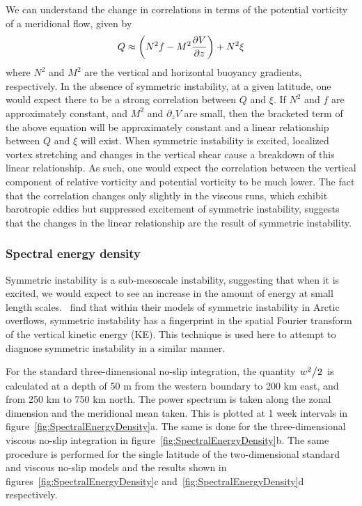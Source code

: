     We can understand the change in correlations in terms of the potential vorticity of a meridional flow, given by
    \begin{equation}
        Q \approx \bigg(N^2 f - M^2 \pdv{V}{z} \bigg) + N^2 \xi
    \end{equation}
    where $N^2$ and $M^2$ are the vertical and horizontal buoyancy gradients, respectively. In the absence of symmetric instability, at a given latitude, one would expect there to be a strong correlation between $Q$ and $\xi$. If $N^2$ and $f$ are approximately constant, and $M^2$ and $\partial_z V$ are small, then the bracketed term of the above equation will be approximately constant and a linear relationship between $Q$ and $\xi$ will exist. When symmetric instability is excited, localized vortex stretching and changes in the vertical shear cause a breakdown of this linear relationship. As such, one would expect the correlation between the vertical component of relative vorticity and potential vorticity to be much lower. The fact that the correlation changes only slightly in the viscous runs, which exhibit barotropic eddies but suppressed excitement of symmetric instability, suggests that the changes in the linear relationship are the result of symmetric instability.

    \subsubsection{Spectral energy density}
    Symmetric instability is a sub-mesoscale instability, suggesting that when it is excited, we would expect to see an increase in the amount of energy at small length scales.~\citet{Yankovsky2019} find that within their models of symmetric instability in Arctic overflows, symmetric instability has a fingerprint in the spatial Fourier transform of the vertical kinetic energy (KE). This technique is used here to attempt to diagnose symmetric instability in a similar manner.
    
    For the standard three-dimensional no-slip integration, the quantity $\flatfrac{w^2}{2}$ is calculated at a depth of 50 m from the western boundary to 200 km east, and from 250 km to 750 km north. The power spectrum is taken along the zonal dimension and the meridional mean taken. This is plotted at 1 week intervals in figure~\ref{fig:SpectralEnergyDensity}a. The same is done for the three-dimensional viscous no-slip integration in figure~\ref{fig:SpectralEnergyDensity}b. The same procedure is performed for the single latitude of the two-dimensional standard and viscous no-slip models and the results shown in figures~\ref{fig:SpectralEnergyDensity}c and~\ref{fig:SpectralEnergyDensity}d respectively.

